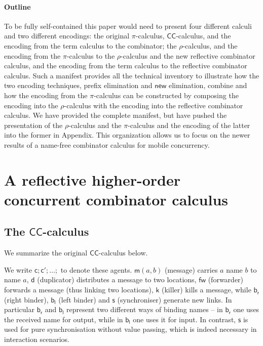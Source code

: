\documentclass[submission,copyright,creativecommons]{eptcs}
\newcommand{\new}{\mathsf{new}}
\newcommand{\pic}{$\pi$-calculus}
\newcommand{\ccomb}{$\mathsf{CC}$-calculus}
\newcommand{\bc}{\mathbin{\mathbf{::=}}}
\newcommand{\bm}{\mathbin{\mathbf\mid}}
\newcommand{\rhoc}{$\rho$-calculus}
\theoremstyle{definition}
\theoremstyle{remark}
\theoremstyle{remark}
\begin{document}
\paragraph*{Outline}
To be fully self-contained this paper would need to present four
different calculi and two different encodings: the original {\pic},
{\ccomb}, and the encoding from the term calculus
to the combinator; the {\rhoc}, and the encoding from the {\pic\;} to
the {\rhoc} and the new reflective combinator calculus, and the
encoding from the term calculus to the reflective combinator
calculus. Such a manifest provides all the technical inventory to
illustrate how the two encoding techniques, prefix elimination and
$\new$ elimination, combine and how the encoding from the {\pic\;} can
be constructed by composing the encoding into the {\rhoc} with the
encoding into the reflective combinator calculus. We have provided the
complete manifest, but have pushed the presentation of the {\rhoc} and
the {\pic{}} and the encoding of the latter into the former in Appendix. This organization allows us to focus on the newer results of a
name-free combinator calculus for mobile concurrency.


\section{A reflective higher-order concurrent combinator calculus}

\subsection{The {\ccomb}}

We summarize the original {\ccomb} \cite{DBLP:journals/tcs/Yoshida02} below.


We write $\mathsf{c};\mathsf{c'};\ldots;$ to denote these
agents. $\mathsf{m}(a,b)$ (message) carries $a$ name $b$ to name $a$,
$\mathsf{d}$ (duplicator) distributes a message to two locations,
$\mathsf{fw}$ (forwarder) forwards a message (thus linking two
locations), $\mathsf{k}$ (killer) kills a message, while
$\mathsf{b}_{\mathsf{r}}$ (right binder), $\mathsf{b}_{\mathsf{l}}$
(left binder) and $\mathsf{s}$ (synchroniser) generate new links. In
particular $\mathsf{b}_{\mathsf{r}}$ and $\mathsf{b}_{\mathsf{l}}$
represent two different ways of binding names – in
$\mathsf{b}_{\mathsf{r}}$ one uses the received name for output, while
in $\mathsf{b}_{\mathsf{l}}$ one uses it for input. In contrast,
$\mathsf{s}$ is used for pure synchronisation without value passing,
which is indeed necessary in interaction scenarios.
\end{document}
